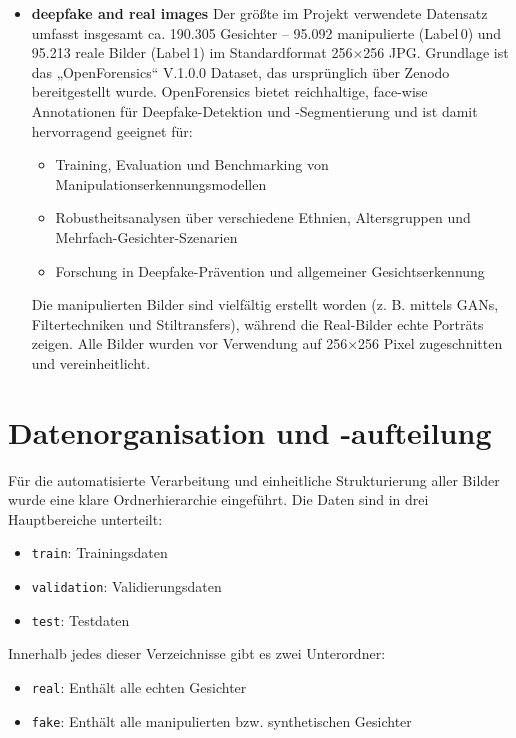 \begin{itemize}
      \item \textbf{deepfake and real images}\cite{le_et_al_openforensics_2025}\:  
  Der größte im Projekt verwendete Datensatz umfasst insgesamt ca. 190.305 Gesichter – 95.092 manipulierte (Label\,0) und 95.213 reale Bilder (Label\,1) im Standardformat 256×256 JPG. Grundlage ist das „OpenForensics“ V.1.0.0 Dataset, das ursprünglich über Zenodo bereitgestellt wurde. OpenForensics bietet reichhaltige, face-wise Annotationen für Deepfake-Detektion und -Segmentierung und ist damit hervorragend geeignet für:
  \begin{itemize}
    \item Training, Evaluation und Benchmarking von Manipulationserkennungsmodellen
    \item Robustheitsanalysen über verschiedene Ethnien, Altersgruppen und Mehrfach-Gesichter-Szenarien
    \item Forschung in Deepfake-Prävention und allgemeiner Gesichtserkennung
  \end{itemize}
  Die manipulierten Bilder sind vielfältig erstellt worden (z. B. mittels GANs, Filtertechniken und Stiltransfers), während die Real-Bilder echte Porträts zeigen. Alle Bilder wurden vor Verwendung auf 256×256 Pixel zugeschnitten und vereinheitlicht.

\end{itemize}

\section{Datenorganisation und -aufteilung}

Für die automatisierte Verarbeitung und einheitliche Strukturierung aller Bilder wurde eine klare Ordnerhierarchie eingeführt. Die Daten sind in drei Hauptbereiche unterteilt:

\begin{itemize}
  \item \texttt{train}: Trainingsdaten  
  \item \texttt{validation}: Validierungsdaten  
  \item \texttt{test}: Testdaten  
\end{itemize}

Innerhalb jedes dieser Verzeichnisse gibt es zwei Unterordner:

\begin{itemize}
  \item \texttt{real}: Enthält alle echten Gesichter  
  \item \texttt{fake}: Enthält alle manipulierten bzw. synthetischen Gesichter  
\end{itemize}

